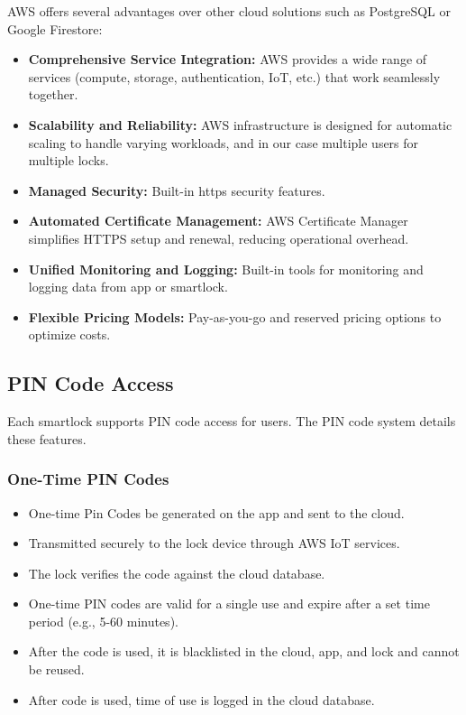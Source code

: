 AWS offers several advantages over other cloud solutions such as PostgreSQL or Google Firestore:
\begin{itemize}
    \item \textbf{Comprehensive Service Integration:} AWS provides a wide range of services (compute, storage, authentication, IoT, etc.) that work seamlessly together.
    \item \textbf{Scalability and Reliability:} AWS infrastructure is designed for automatic scaling to handle varying workloads, and in our case multiple users for multiple locks.
    \item \textbf{Managed Security:} Built-in https security features.
    \item \textbf{Automated Certificate Management:} AWS Certificate Manager simplifies HTTPS setup and renewal, reducing operational overhead.
    \item \textbf{Unified Monitoring and Logging:} Built-in tools for monitoring and logging data from app or smartlock.
    \item \textbf{Flexible Pricing Models:} Pay-as-you-go and reserved pricing options to optimize costs.
\end{itemize}

\subsection{PIN Code Access}
Each smartlock supports PIN code access for users. The PIN code system details these features.

\subsubsection*{One-Time PIN Codes}
\begin{itemize}
    \item One-time Pin Codes be generated on the app and sent to the cloud.
    \item Transmitted securely to the lock device through AWS IoT services.
    \item The lock verifies the code against the cloud database.
    \item One-time PIN codes are valid for a single use and expire after a set time period (e.g., 5-60 minutes).
    \item After the code is used, it is blacklisted in the cloud, app, and lock and cannot be reused.
    \item After code is used, time of use is logged in the cloud database.
\end{itemize}

